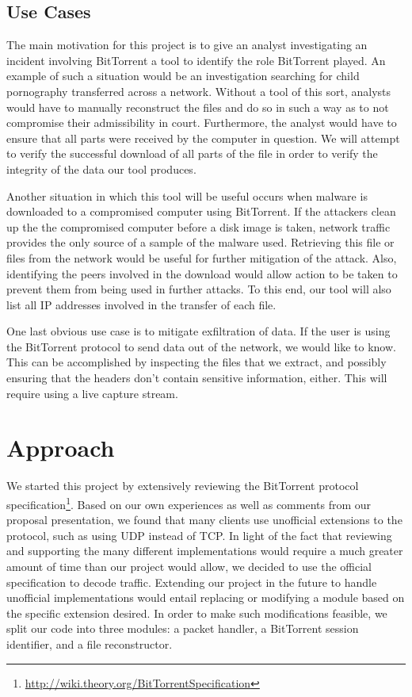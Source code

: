 \documentclass{acm_proc_article-sp}
\begin{document}
\subsection{Use Cases}
The main motivation for this project is to give an analyst investigating an
incident involving BitTorrent a tool to identify the role BitTorrent played.  An
example of such a situation would be an investigation searching for child
pornography transferred across a network. Without a tool of this sort, analysts
would have to manually reconstruct the files and do so in such a way as to not
compromise their admissibility in court. Furthermore, the analyst would have to
ensure that all parts were received by the computer in question. We will attempt
to verify the successful download of all parts of the file in order to verify
the integrity of the data our tool produces.

Another situation in which this tool will be useful occurs when malware is
downloaded to a compromised computer using BitTorrent. If the attackers clean up
the the compromised computer before a disk image is taken, network traffic
provides the only source of a sample of the malware used. Retrieving this file
or files from the network would be useful for further mitigation of the
attack. Also, identifying the peers involved in the download would allow action
to be taken to prevent them from being used in further attacks. To this end, our
tool will also list all IP addresses involved in the transfer of each file.

One last obvious use case is to mitigate exfiltration of data.  If the user is
using the BitTorrent protocol to send data out of the network, we would like to
know.  This can be accomplished by inspecting the files that we extract, and
possibly ensuring that the headers don't contain sensitive information, either.
This will require using a live capture stream.



\section{Approach}
We started this project by extensively reviewing the BitTorrent protocol 
specification\footnote{\url{http://wiki.theory.org/BitTorrentSpecification}}. 
Based on our own experiences as well as comments from our proposal presentation,
we found that many clients use unofficial extensions to the protocol, such as
using UDP instead of TCP. In light of the fact that reviewing and supporting 
the many different implementations would require a much greater amount of time 
than our project would allow, we decided to use the official specification to 
decode traffic. Extending our project in the future to handle unofficial 
implementations would entail replacing or modifying  a module based on the 
specific extension desired. In order to make such modifications feasible, we 
split our code into three modules: a packet handler, a BitTorrent session 
identifier, and a file reconstructor.
\end{document}
